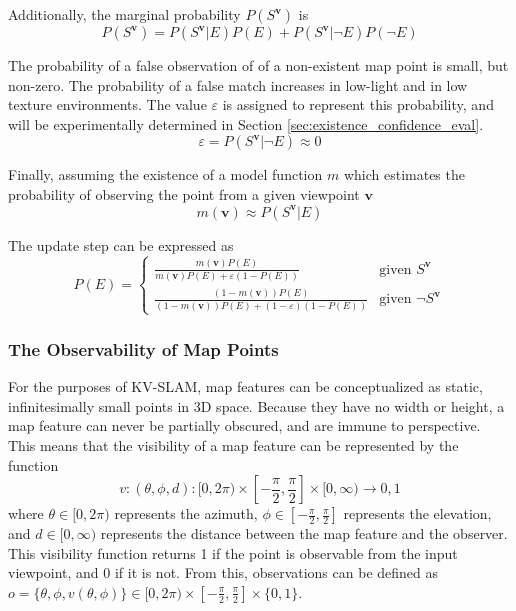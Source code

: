 Additionally, the marginal probability $P(S^{\boldsymbol{v}})$ is
$$
    P(S^{\boldsymbol{v}}) = P(S^{\boldsymbol{v}}|E)P(E) + P(S^{\boldsymbol{v}}|\neg E)P(\neg E)
$$

The probability of a false observation of of a non-existent map point is small, but non-zero. The probability of a false match increases in low-light and in low texture environments. The value $\varepsilon$ is assigned to represent this probability, and will be experimentally determined in Section \ref{sec:existence_confidence_eval}.
$$
    \varepsilon = P(S^{\boldsymbol{v}}|\neg E) \approx 0
$$

Finally, assuming the existence of a model function $m$ which estimates the probability of observing the point from a given viewpoint $\boldsymbol{v}$
$$
    m(\boldsymbol{v}) \approx P(S^{\boldsymbol{v}}|E)
$$

The update step can be expressed as
\[
    P(E) = \begin{cases}
        \frac{m(\boldsymbol{v})P(E)}{m(\boldsymbol{v})P(E) + \varepsilon(1-P(E))}             & \text{given }S^{\boldsymbol{v}}      \\
        \frac{(1-m(\boldsymbol{v}))P(E)}{(1-m(\boldsymbol{v}))P(E) + (1-\varepsilon)(1-P(E))} & \text{given }\neg S^{\boldsymbol{v}}
    \end{cases}
\]

\subsubsection{The Observability of Map Points}

For the purposes of KV-SLAM, map features can be conceptualized as static, infinitesimally small points in 3D space. Because they have no width or height, a map feature can never be partially obscured, and are immune to perspective. This means that the visibility of a map feature can be represented by the function
$$
    v:(\theta,\phi,d):[0,2\pi)\times\left[-\frac{\pi}{2},\frac{\pi}{2}\right]\times[0,\infty)\to{0,1}
$$
where $\theta\in[0,2\pi)$ represents the azimuth, $\phi\in\left[-\frac{\pi}{2},\frac{\pi}{2}\right]$ represents the elevation, and $d\in[0,\infty)$ represents the distance between the map feature and the observer. This visibility function returns 1 if the point is observable from the input viewpoint, and 0 if it is not. From this, observations can be defined as $o=\{\theta,\phi,v(\theta,\phi)\}\in[0,2\pi)\times\left[-\frac{\pi}{2},\frac{\pi}{2}\right]\times\{0,1\}$.

